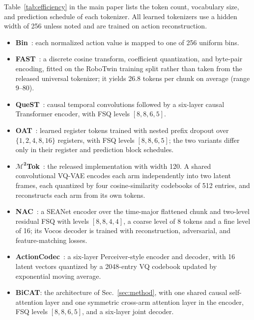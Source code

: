 Table~\ref{tab:efficiency} in the main paper lists the token count,
vocabulary size, and prediction schedule of each tokenizer. All learned
tokenizers use a hidden width of 256 unless noted and are trained on action
reconstruction.
\begin{itemize}
    \item \textbf{Bin}~\cite{kim2024openvla}: each normalized action value is
    mapped to one of 256 uniform bins.
    \item \textbf{FAST}~\cite{pertsch2025fast}: a discrete cosine transform,
    coefficient quantization, and byte-pair encoding, fitted on the RoboTwin
    training split rather than taken from the released universal tokenizer;
    it yields 26.8 tokens per chunk on average (range 9--80).
    \item \textbf{QueST}~\cite{mete2024quest}: causal temporal convolutions
    followed by a six-layer causal Transformer encoder, with FSQ levels
    $[8,8,6,5]$.
    \item \textbf{OAT}~\cite{liu2026oat_rss}: learned register tokens trained
    with nested prefix dropout over $\{1,2,4,8,16\}$ registers, with FSQ
    levels $[8,8,6,5]$; the two variants differ only in their register and
    prediction block schedules.
    \item $\boldsymbol{\mathcal{M}^{2}}$\textbf{Tok}~\cite{xu2026m2tok}: the
    released implementation with width 120. A shared convolutional VQ-VAE
    encodes each arm independently into two latent frames, each quantized by
    four cosine-similarity codebooks of 512 entries, and reconstructs each
    arm from its own tokens.
    \item \textbf{NAC}~\cite{jawaid2026nac}: a SEANet encoder over the
    time-major flattened chunk and two-level residual FSQ with levels
    $[8,8,4,4]$, a coarse level of 8 tokens and a fine level of 16; its
    Vocos decoder is trained with reconstruction, adversarial, and
    feature-matching losses.
    \item \textbf{ActionCodec}~\cite{dong2026actioncodec}: a six-layer
    Perceiver-style encoder and decoder, with 16 latent vectors quantized by
    a 2048-entry VQ codebook updated by exponential moving average.
    \item \textbf{BiCAT}: the architecture of Sec.~\ref{sec:method}, with one
    shared causal self-attention layer and one symmetric cross-arm attention
    layer in the encoder, FSQ levels $[8,8,6,5]$, and a six-layer joint
    decoder.
\end{itemize}

